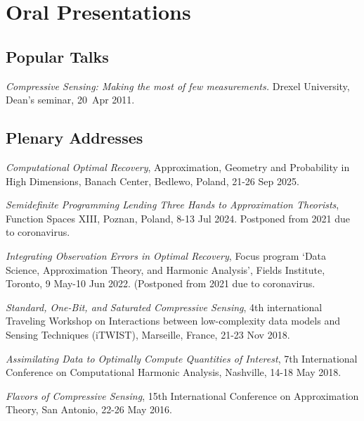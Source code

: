 \documentclass[11pt]{article}
\begin{document}
\section{Oral Presentations}

\subsection{Popular Talks}
\betaremune
\item {\sl Compressive Sensing: Making the most of few measurements.}
Drexel University, Dean's seminar, 20~Apr 2011.
\eetaremune

\subsection{Plenary Addresses}
\bitemize
\item {\sl Computational Optimal Recovery}, Approximation, Geometry and Probability in High Dimensions, Banach Center, Bedlewo, Poland,
21-26 Sep 2025.
\item {\sl Semidefinite Programming Lending Three Hands to Approximation Theorists}, Function Spaces XIII, Poznan, Poland,  8-13 Jul 2024.
{\small Postponed  from 2021 due to coronavirus.} %
\item {\sl Integrating Observation Errors in Optimal Recovery}, Focus program `Data Science, Approximation Theory, and Harmonic Analysis', Fields Institute, Toronto,  9 May-10 Jun 2022.
{\small (Postponed from 2021 due to coronavirus.} %
\item {\sl Standard, One-Bit, and Saturated Compressive Sensing}, 4th international Traveling Workshop on Interactions between low-complexity data models and Sensing Techniques (iTWIST),
Marseille, France, 21-23 Nov 2018.
\item {\sl Assimilating Data to Optimally Compute Quantities of Interest}, 7th International Conference on Computational Harmonic Analysis,
Nashville, 14-18 May 2018.
\item {\sl Flavors of Compressive Sensing}, 
15th International Conference on Approximation Theory, San Antonio, 22-26 May 2016.
\eitemize
\end{document}
